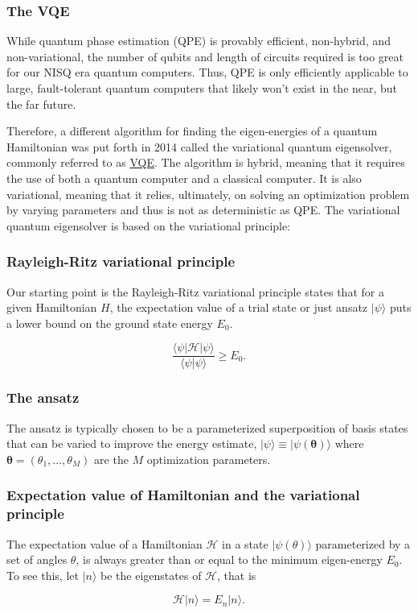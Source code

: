 \documentclass{beamer}
\begin{document}
\begin{frame}
\frametitle{The VQE}

While quantum phase estimation (QPE) is provably efficient,
non-hybrid, and non-variational, the number of qubits and length of
circuits required is too great for our NISQ era quantum
computers. Thus, QPE is only efficiently applicable to large,
fault-tolerant quantum computers that likely won't exist in the near,
but the far future.

Therefore, a different algorithm for finding the eigen-energies of a
quantum Hamiltonian was put forth in 2014 called the variational
quantum eigensolver, commonly referred to as
\href{{https://arxiv.org/abs/2111.05176}}{VQE}. The algorithm is hybrid,
meaning that it requires the use of both a quantum computer and a
classical computer. It is also variational, meaning that it relies,
ultimately, on solving an optimization problem by varying parameters
and thus is not as deterministic as QPE. The variational quantum
eigensolver is based on the variational principle:
\end{frame}

\begin{frame}
\frametitle{Rayleigh-Ritz variational principle}

Our starting point is the Rayleigh-Ritz variational principle states
that for a given Hamiltonian $H$, the expectation value of a trial
state or just ansatz $\vert \psi \rangle$ puts a lower bound on the
ground state energy $E_0$.

\[
    \frac{\langle \psi \vert \mathcal{H}\vert \psi \rangle}{\langle \psi \vert \psi \rangle} \geq E_0.
\]
\end{frame}

\begin{frame}
\frametitle{The ansatz}

The ansatz is typically chosen to be a parameterized superposition of
basis states that can be varied to improve the energy estimate,
$\vert \psi\rangle \equiv \vert \psi(\boldsymbol{\theta})\rangle$ where
$\boldsymbol{\theta} = (\theta_1, \ldots, \theta_M)$ are the $M$
optimization parameters.
\end{frame}

\begin{frame}
\frametitle{Expectation value of Hamiltonian and the variational principle}

The expectation value of a Hamiltonian $\mathcal{H}$ in a state
$|\psi(\theta)\rangle$ parameterized by a set of angles $\theta$, is
always greater than or equal to the minimum eigen-energy $E_0$. To see
this, let $|n\rangle$ be the eigenstates of $\mathcal{H}$, that is

\[
\mathcal{H}|n\rangle=E_n|n\rangle.
\]
\end{frame}
\end{document}
